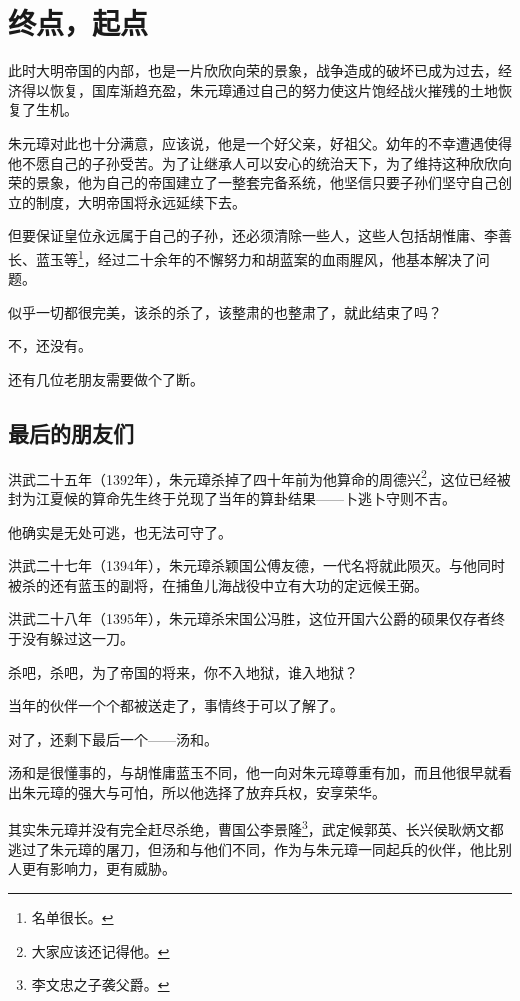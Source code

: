 \section{终点，起点}
\ifnum{}
	\begin{multicols}{\theparacolNo}
		\fi
		此时大明帝国的内部，也是一片欣欣向荣的景象，战争造成的破坏已成为过去，经济得以恢复，国库渐趋充盈，朱元璋通过自己的努力使这片饱经战火摧残的土地恢复了生机。

		朱元璋对此也十分满意，应该说，他是一个好父亲，好祖父。幼年的不幸遭遇使得他不愿自己的子孙受苦。为了让继承人可以安心的统治天下，为了维持这种欣欣向荣的景象，他为自己的帝国建立了一整套完备系统，他坚信只要子孙们坚守自己创立的制度，大明帝国将永远延续下去。

		但要保证皇位永远属于自己的子孙，还必须清除一些人，这些人包括胡惟庸、李善长、蓝玉等\footnote{名单很长。}，经过二十余年的不懈努力和胡蓝案的血雨腥风，他基本解决了问题。

		似乎一切都很完美，该杀的杀了，该整肃的也整肃了，就此结束了吗？

		不，还没有。

		还有几位老朋友需要做个了断。

		\subsection{最后的朋友们}
		洪武二十五年（1392年），朱元璋杀掉了四十年前为他算命的周德兴\footnote{大家应该还记得他。}，这位已经被封为江夏候的算命先生终于兑现了当年的算卦结果——卜逃卜守则不吉。

		他确实是无处可逃，也无法可守了。

		洪武二十七年（1394年），朱元璋杀颖国公傅友德，一代名将就此陨灭。与他同时被杀的还有蓝玉的副将，在捕鱼儿海战役中立有大功的定远候王弼。

		洪武二十八年（1395年），朱元璋杀宋国公冯胜，这位开国六公爵的硕果仅存者终于没有躲过这一刀。

		杀吧，杀吧，为了帝国的将来，你不入地狱，谁入地狱？

		当年的伙伴一个个都被送走了，事情终于可以了解了。

		对了，还剩下最后一个——汤和。

		汤和是很懂事的，与胡惟庸蓝玉不同，他一向对朱元璋尊重有加，而且他很早就看出朱元璋的强大与可怕，所以他选择了放弃兵权，安享荣华。

		其实朱元璋并没有完全赶尽杀绝，曹国公李景隆\footnote{李文忠之子袭父爵。}，武定候郭英、长兴侯耿炳文都逃过了朱元璋的屠刀，但汤和与他们不同，作为与朱元璋一同起兵的伙伴，他比别人更有影响力，更有威胁。


\end{multicols}
